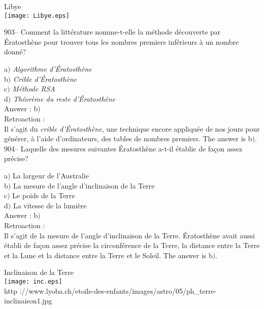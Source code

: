 ﻿\documentclass[letterpaper, 12pt]{article}
\begin{document}
        \begin{center}
        Libye\\
    \texttt{[image: Libye.eps]}\\
    \end{center}

903-- Comment la litt\'erature nomme-t-elle la m\'ethode d\'ecouverte par
\'Eratosth\`ene pour trouver
tous les nombres premiers inf\'erieurs \`a un nombre donn\'e?

a$)$ {\sl Algorithme d'\'Eratosth\`ene} \\
b$)$ {\sl Crible d'\'Eratosth\`ene} \\
c$)$ {\sl M\'ethode RSA} \\
d$)$ {\sl Th\'eor\`eme du reste d'\'Eratosth\`ene}\\

Answer : b$)$\\

Retroaction : \\
Il s'agit du {\sl crible d'\'Eratosth\`ene}, une technique encore
appliqu\'ee de nos jours
pour g\'en\'erer, \`a l'aide d'ordinateurs, des tables de nombres premiers.
The answer is b$)$.\\

904-- Laquelle des mesures suivantes \'Eratosth\`ene a-t-il
\'etablie de fa\c con assez pr\'ecise?

a$)$ La largeur de l'Australie \\
b$)$ La mesure de l'angle d'inclinaison de la Terre \\
c$)$ Le poids de la Terre \\
d$)$ La vitesse de la lumi\`ere\\

Answer : b$)$\\

Retroaction :\\
Il s'agit de la mesure de l'angle d'inclinaison de la Terre.
\'Eratosth\`ene avait aussi \'etabli de fa\c con assez pr\'ecise la
circonf\'erence de la Terre, la distance entre la Terre et la Lune
et la distance entre la
Terre et le Soleil. The answer is b$)$.\\

        \begin{center}
        Inclinaison de la Terre\\
    \texttt{[image: inc.eps]}\\
        {\footnotesize http
://www.lyoba.ch/etoile-des-enfants/images/astro/05/ph\_terre-inclinaison1.jpg}
    \end{center}
\end{document}
